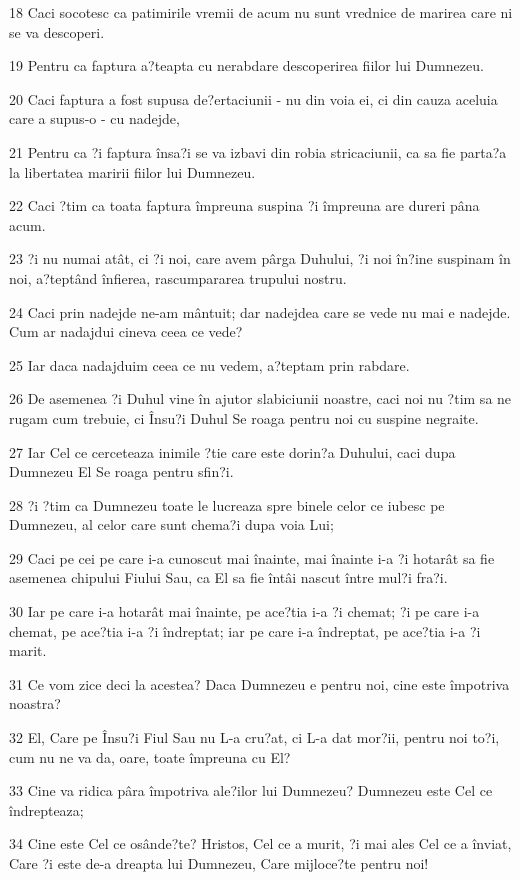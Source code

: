\par 18 Caci socotesc ca patimirile vremii de acum nu sunt vrednice de marirea care ni se va descoperi.
\par 19 Pentru ca faptura a?teapta cu nerabdare descoperirea fiilor lui Dumnezeu.
\par 20 Caci faptura a fost supusa de?ertaciunii - nu din voia ei, ci din cauza aceluia care a supus-o - cu nadejde,
\par 21 Pentru ca ?i faptura însa?i se va izbavi din robia stricaciunii, ca sa fie parta?a la libertatea maririi fiilor lui Dumnezeu.
\par 22 Caci ?tim ca toata faptura împreuna suspina ?i împreuna are dureri pâna acum.
\par 23 ?i nu numai atât, ci ?i noi, care avem pârga Duhului, ?i noi în?ine suspinam în noi, a?teptând înfierea, rascumpararea trupului nostru.
\par 24 Caci prin nadejde ne-am mântuit; dar nadejdea care se vede nu mai e nadejde. Cum ar nadajdui cineva ceea ce vede?
\par 25 Iar daca nadajduim ceea ce nu vedem, a?teptam prin rabdare.
\par 26 De asemenea ?i Duhul vine în ajutor slabiciunii noastre, caci noi nu ?tim sa ne rugam cum trebuie, ci Însu?i Duhul Se roaga pentru noi cu suspine negraite.
\par 27 Iar Cel ce cerceteaza inimile ?tie care este dorin?a Duhului, caci dupa Dumnezeu El Se roaga pentru sfin?i.
\par 28 ?i ?tim ca Dumnezeu toate le lucreaza spre binele celor ce iubesc pe Dumnezeu, al celor care sunt chema?i dupa voia Lui;
\par 29 Caci pe cei pe care i-a cunoscut mai înainte, mai înainte i-a ?i hotarât sa fie asemenea chipului Fiului Sau, ca El sa fie întâi nascut între mul?i fra?i.
\par 30 Iar pe care i-a hotarât mai înainte, pe ace?tia i-a ?i chemat; ?i pe care i-a chemat, pe ace?tia i-a ?i îndreptat; iar pe care i-a îndreptat, pe ace?tia i-a ?i marit.
\par 31 Ce vom zice deci la acestea? Daca Dumnezeu e pentru noi, cine este împotriva noastra?
\par 32 El, Care pe Însu?i Fiul Sau nu L-a cru?at, ci L-a dat mor?ii, pentru noi to?i, cum nu ne va da, oare, toate împreuna cu El?
\par 33 Cine va ridica pâra împotriva ale?ilor lui Dumnezeu? Dumnezeu este Cel ce îndrepteaza;
\par 34 Cine este Cel ce osânde?te? Hristos, Cel ce a murit, ?i mai ales Cel ce a înviat, Care ?i este de-a dreapta lui Dumnezeu, Care mijloce?te pentru noi!
